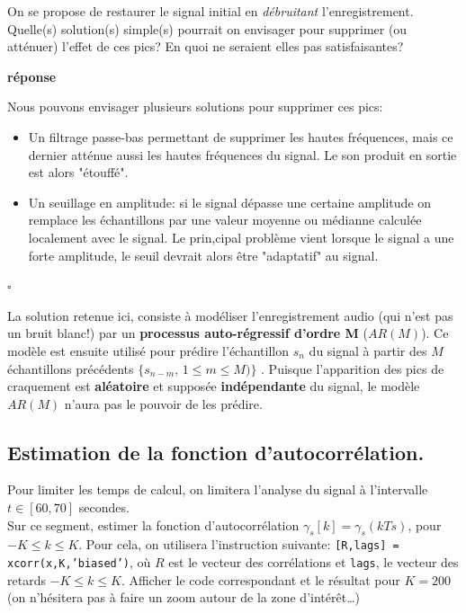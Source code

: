 \documentclass{article}
\newcommand{\debutrep}[1]{\color{blue}\begin{center} \hrulefill \textbf{ #1 } \hrulefill \end{center} }
\newcommand{\finrep}{\vspace*{5mm}\hfill $\square$\color{black}\vspace*{5mm}}
\begin{document}
On se propose de restaurer le signal initial en {\em débruitant} l'enregistrement.\\
Quelle(s) solution(s) simple(s) pourrait on envisager pour supprimer (ou atténuer) l'effet de ces pics? En quoi ne seraient elles pas satisfaisantes?

\debutrep{réponse}
Nous pouvons envisager plusieurs solutions pour supprimer ces pics:
\begin{itemize}
    \item Un filtrage passe-bas permettant de supprimer les hautes fréquences, mais ce dernier atténue aussi les hautes fréquences du signal. Le son produit en sortie est alors "étouffé".
    
    \item Un seuillage en amplitude: si le signal dépasse une certaine amplitude on remplace les échantillons par une valeur moyenne ou médianne calculée localement avec le signal. Le prin,cipal problème vient lorsque le signal a une forte amplitude, le seuil devrait alors être "adaptatif" au signal.
    
\end{itemize}
\finrep

\vspace*{3mm}
La solution retenue ici, consiste à modéliser l'enregistrement audio (qui n'est pas un bruit blanc!) par un \textbf{processus auto-régressif d'ordre M }($AR(M)$). Ce modèle est ensuite utilisé pour prédire l'échantillon  $s_n$ du signal à partir des $M$ échantillons précédents $\{s_{n-m},\,1 \leq m \leq M)\}$ . Puisque l'apparition des pics de craquement est \textbf{aléatoire} et supposée \textbf{indépendante} du signal, le modèle $AR(M)$ n'aura pas le pouvoir de  les prédire.


\subsection{Estimation de la fonction d'autocorrélation.}

Pour limiter les temps de calcul, on limitera l'analyse du signal à l'intervalle $t\in[60,70]$ secondes. \\
Sur ce segment, estimer la fonction d'autocorrélation $\gamma_s[k] = \gamma_s(kTs)$, 
pour $-K\leq k \leq K$. Pour cela, on utilisera l'instruction suivante:  {\tt [R,lags] = xcorr(x,K,'biased')}, où $R$ est le vecteur des corrélations et {\tt lags}, le vecteur des retards $-K\leq k \leq K$. Afficher le code correspondant et le résultat pour $K=200$ (on n'hésitera pas à faire un zoom autour de la zone d'intérêt\ldots) 
\end{document}
